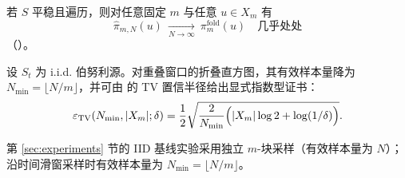 若 $S$ 平稳且遍历，则对任意固定 $m$ 与任意 $u\in X_m$ 有
\[
\hat{\pi}_{m,N}(u)\ \xrightarrow[N\to\infty]{}\ \pi_m^{\mathrm{fold}}(u)
\quad\text{几乎处处}
\]
（\cite{WaltersErgodicTheory}）。

设 $S_t$ 为 i.i.d. 伯努利源。对重叠窗口的折叠直方图，其有效样本量降为 $N_{\min}=\lfloor N/m\rfloor$，并可由 \cite{WeissmanEtAl2003L1Empirical} 的 TV 置信半径给出显式指数型证书：
\[
\varepsilon_{\mathrm{TV}}(N_{\min},|X_m|;\delta)=\frac12\sqrt{\frac{2}{N_{\min}}\Bigl(|X_m|\log 2+\log(1/\delta)\Bigr)}.
\]

\begin{remark}\label{rem:iid-overlap-vs-blocks}
第 \ref{sec:experiments} 节的 IID 基线实验采用独立 $m$-块采样（有效样本量为 $N$）；沿时间滑窗采样时有效样本量为 $N_{\min}=\lfloor N/m\rfloor$。
\end{remark}


